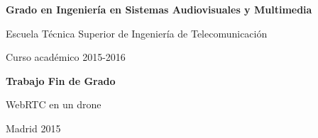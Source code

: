 \thispagestyle{empty}

\vspace{2cm}

\begin{figure}[htb]
\centerline{}
\end{figure}

\vspace{8mm}
\begin{center}
{\Large {\bf Grado en Ingeniería en Sistemas Audiovisuales y Multimedia}}
\vspace{8mm}

{\large Escuela Técnica Superior de Ingeniería de Telecomunicación}
\vspace{8mm}

{\large Curso académico 2015-2016}

\vspace{1.0cm}

{\large {\bf Trabajo Fin de Grado}} 

\vspace{2cm}
{\Huge {WebRTC en un drone}}

\end{center}

\vspace{4cm}

\vspace{0.5cm}
\begin{center}
\large{Madrid 2015}
\end{center}

